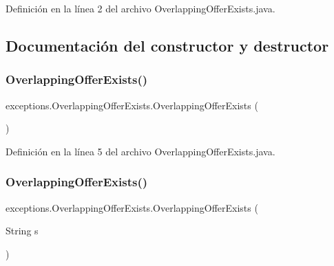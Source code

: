 Definición en la línea 2 del archivo Overlapping\+Offer\+Exists.\+java.



\subsection{Documentación del constructor y destructor}
\mbox{\label{classexceptions_1_1_overlapping_offer_exists_a1ba2d73acc9428e642786973e8b2b6b3}} 
\subsubsection{\texorpdfstring{OverlappingOfferExists()}{OverlappingOfferExists()}\hspace{0.1cm}{\footnotesize\ttfamily [1/2]}}
{\footnotesize\ttfamily exceptions.\+Overlapping\+Offer\+Exists.\+Overlapping\+Offer\+Exists (\begin{DoxyParamCaption}{ }\end{DoxyParamCaption})}



Definición en la línea 5 del archivo Overlapping\+Offer\+Exists.\+java.


\begin{DoxyCode}{0}

\end{DoxyCode}
\mbox{\label{classexceptions_1_1_overlapping_offer_exists_a053baab9b6c9e1da073098c4cfbcdc45}} 
\subsubsection{\texorpdfstring{OverlappingOfferExists()}{OverlappingOfferExists()}\hspace{0.1cm}{\footnotesize\ttfamily [2/2]}}
{\footnotesize\ttfamily exceptions.\+Overlapping\+Offer\+Exists.\+Overlapping\+Offer\+Exists (\begin{DoxyParamCaption}\item[{String}]{s }\end{DoxyParamCaption})}



